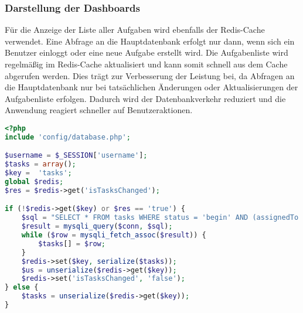 \subsubsection*{Darstellung der Dashboards}
Für die Anzeige der Liste aller Aufgaben wird ebenfalls der Redis-Cache verwendet. Eine Abfrage an die Hauptdatenbank erfolgt nur dann, wenn sich ein Benutzer einloggt oder eine neue Aufgabe erstellt wird. Die Aufgabenliste wird regelmäßig im Redis-Cache aktualisiert und kann somit schnell aus dem Cache abgerufen werden. Dies trägt zur Verbesserung der Leistung bei, da Abfragen an die Hauptdatenbank nur bei tatsächlichen Änderungen oder Aktualisierungen der Aufgabenliste erfolgen. Dadurch wird der Datenbankverkehr reduziert und die Anwendung reagiert schneller auf Benutzeraktionen.\cite{Radfelder2023}

\begin{lstlisting}[language=PHP, caption=Caching von Aufgabendaten in redis]
<?php
include 'config/database.php';

$username = $_SESSION['username'];
$tasks = array();
$key =  'tasks';
global $redis;
$res = $redis->get('isTasksChanged');

if (!$redis->get($key) or $res == 'true') {
    $sql = "SELECT * FROM tasks WHERE status = 'begin' AND (assignedTo = '$username' OR createBy = '$username')  ";
    $result = mysqli_query($conn, $sql);
    while ($row = mysqli_fetch_assoc($result)) {
        $tasks[] = $row;
    }
    $redis->set($key, serialize($tasks));
    $us = unserialize($redis->get($key));
    $redis->set('isTasksChanged', 'false');
} else {
    $tasks = unserialize($redis->get($key));
}
\end{lstlisting}